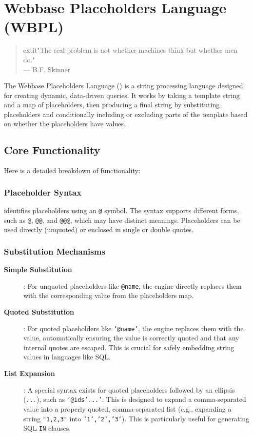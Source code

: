 
\chapter{Webbase Placeholders Language (WBPL)}
\label{chap:wbpl}

\begin{quote}
	extit{"The real problem is not whether machines think but whether men do."} \\
— B.F. Skinner
\end{quote}

The Webbase Placeholders Language (\wbpl{}) is a string processing language designed for creating dynamic, data-driven queries. It works by taking a template string and a map of placeholders, then producing a final string by substituting placeholders and conditionally including or excluding parts of the template based on whether the placeholders have values.

\section{Core Functionality}
\label{sec:wbpl-core}

Here is a detailed breakdown of \wbpl{} functionality:

\subsection{Placeholder Syntax}

\wbpl{} identifies placeholders using an \texttt{@} symbol. The syntax supports different forms, such as \texttt{@}, \texttt{@@}, and \texttt{@@@}, which may have distinct meanings. Placeholders can be used directly (unquoted) or enclosed in single or double quotes.

\subsection{Substitution Mechanisms}

\begin{description}
\item[\textbf{Simple Substitution}]: For unquoted placeholders like \texttt{@name}, the engine directly replaces them with the corresponding value from the placeholders map.

\item[\textbf{Quoted Substitution}]: For quoted placeholders like \texttt{'@name'}, the engine replaces them with the value, automatically ensuring the value is correctly quoted and that any internal quotes are escaped. This is crucial for safely embedding string values in languages like SQL.

\item[\textbf{List Expansion}]: A special syntax exists for quoted placeholders followed by an ellipsis (\texttt{...}), such as \texttt{'@ids'...'}. This is designed to expand a comma-separated value into a properly quoted, comma-separated list (e.g., expanding a string \texttt{"1,2,3"} into \texttt{'1','2','3'}). This is particularly useful for generating SQL \texttt{IN} clauses.
\end{description}

